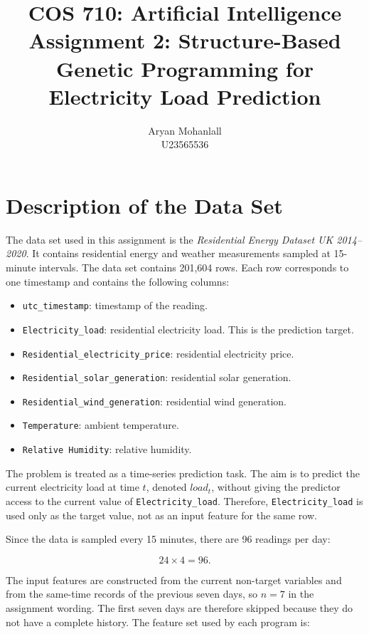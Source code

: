 \documentclass{article}
\title{COS 710: Artificial Intelligence \\[1ex]
\large Assignment 2: Structure-Based Genetic Programming for Electricity Load Prediction}
\author{Aryan Mohanlall \\ U23565536}
\date{}
\begin{document}
\maketitle

\section{Description of the Data Set}

The data set used in this assignment is the \textit{Residential Energy Dataset UK 2014--2020}. It contains residential energy and weather measurements sampled at 15-minute intervals. The data set contains 201,604 rows. Each row corresponds to one timestamp and contains the following columns:

\begin{itemize}
    \item \texttt{utc\_timestamp}: timestamp of the reading.
    \item \texttt{Electricity\_load}: residential electricity load. This is the prediction target.
    \item \texttt{Residential\_electricity\_price}: residential electricity price.
    \item \texttt{Residential\_solar\_generation}: residential solar generation.
    \item \texttt{Residential\_wind\_generation}: residential wind generation.
    \item \texttt{Temperature}: ambient temperature.
    \item \texttt{Relative Humidity}: relative humidity.
\end{itemize}

The problem is treated as a time-series prediction task. The aim is to predict the current electricity load at time $t$, denoted $load_t$, without giving the predictor access to the current value of \texttt{Electricity\_load}. Therefore, \texttt{Electricity\_load} is used only as the target value, not as an input feature for the same row.

Since the data is sampled every 15 minutes, there are 96 readings per day:

\begin{equation}
24 \times 4 = 96.
\end{equation}

The input features are constructed from the current non-target variables and from the same-time records of the previous seven days, so $n=7$ in the assignment wording. The first seven days are therefore skipped because they do not have a complete history. The feature set used by each program is:
\end{document}
